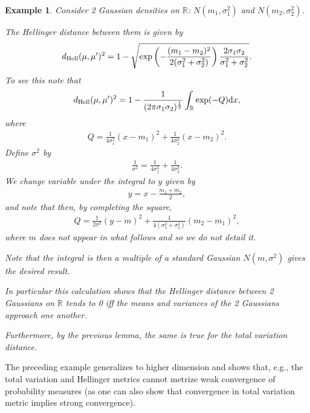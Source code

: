 \documentclass[oneside,11pt]{book}
\numberwithin{equation}{section}
\newtheorem{example}{Example}[section]
\begin{document}
\begin{example}
    Consider 2 Gaussian densities on $\mathbb{R}$: $N(m_1,\sigma_1^2)$ and $N(m_2,\sigma_2^2)$.
    
    The Hellinger distance between them is given by
    \begin{align*}
        d_{\rm Hell}(\mu,\mu')^2 = 1 - \sqrt{\exp\left(-\frac{(m_1 - m_2)^2}{2(\sigma_1^2 + \sigma_2^2)}\right)\frac{2\sigma_1\sigma_2}{\sigma_1^2 + \sigma_2^2}}.
    \end{align*}
    To see this note that
    \begin{align*}
        d_{\rm Hell}(\mu,\mu')^2 = 1 - \frac{1}{(2\pi\sigma_1\sigma_2)^{\frac{1}{2}}}\int_\mathbb{R} \exp(-Q){\rm d}x,
    \end{align*}
    where
    \begin{align*}
        Q = \frac{1}{4\sigma_1^2}(x - m_1)^2 + \frac{1}{4\sigma_2^2}(x - m_2)^2.
    \end{align*}
    Define $\sigma^2$ by
    \begin{align*}
        \frac{1}{\sigma^2} = \frac{1}{4\sigma_1^2} + \frac{1}{4\sigma_2^2}.
    \end{align*}
    We change variable under the integral to $y$ given by
    \begin{align*}
        y = x - \frac{m_1 + m_2}{2},
    \end{align*}
    and note that then, by completing the square,
    \begin{align*}
        Q = \frac{1}{2\sigma^2}(y - m)^2 + \frac{1}{4(\sigma_1^2 + \sigma_2^2)}(m_2 - m_1)^2,
    \end{align*}
    where $m$ does not appear in what follows and so we do not detail it.
    
    Note that the integral is then a multiple of a standard Gaussian $N(m,\sigma^2)$ gives the desired result.
    
    In particular this calculation shows that \emph{the Hellinger distance between 2 Gaussians on $\mathbb{R}$ tends to 0 iff the means and variances of the 2 Gaussians approach one another}.
    
    Furthermore, by the previous lemma, the same is
    true for the total variation distance.
\end{example}
The preceding example generalizes to higher dimension and shows that, e.g., the total variation and Hellinger metrics cannot metrize weak convergence of probability measures (as one can also show that convergence in total variation metric implies strong convergence).
\end{document}
